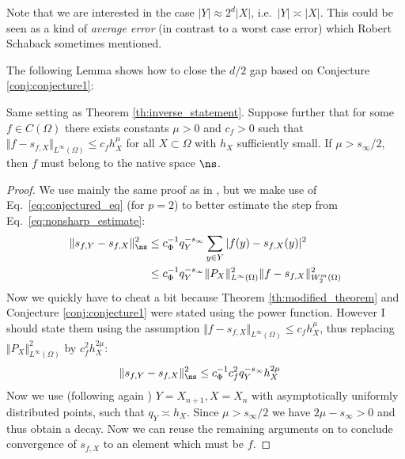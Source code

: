 \documentclass[a4paper, 10pt]{article}
\begin{document}
\begin{rem}
Note that we are interested in the case $|Y| \approx 2^d|X|$, i.e.\ $|Y| \asymp |X|$.
This could be seen as a kind of \textit{average error} (in contrast to a worst case error) which Robert Schaback sometimes mentioned.
\end{rem}

\noindent The following Lemma shows how to close the $d/2$ gap based on Conjecture \ref{conj:conjecture1}:

\begin{lemma}
\label{lem:d_half_gap_closed}
Same setting as Theorem \ref{th:inverse_statement}.
Suppose further that for some $f \in C(\Omega)$ there exists constants $\mu > 0$ and $c_f > 0$ such that $\Vert f - s_{f, X}\Vert_{L^\infty(\Omega)} \leq c_f h_X^\mu$ for all $X \subset \Omega$ with $h_X$ sufficiently small. 
If $\mu > s_\infty / 2$, then $f$ must belong to the native space $\ns$.
\end{lemma}

\begin{proof}
We use mainly the same proof as in \cite[Theorem 6.1]{wendland1997sobolev}, but we make use of Eq.\ \eqref{eq:conjectured_eq} (for $p=2$) to better estimate the step from Eq.\ \eqref{eq:nonsharp_estimate}:
\begin{align*}
%
\Vert s_{f, Y} - s_{f, X} \Vert_{\ns}^2 &\leq c_\Phi^{-1} q_Y^{-s_\infty} \sum_{y \in Y} |f(y) - s_{f, X}(y)|^2 \notag \\
&\leq c_\Phi^{-1} q_Y^{-s_\infty} \Vert P_{X} \Vert_{L^\infty(\Omega)}^2 \Vert f - s_{f, X} \Vert_{W_2^m(\Omega)}^2
\end{align*}
%
%
Now we quickly have to cheat a bit because Theorem \ref{th:modified_theorem} and Conjecture \ref{conj:conjecture1} were stated using the power function. 
However I should state them using the assumption $\Vert f - s_{f, X}\Vert_{L^\infty(\Omega)} \leq c_f h_X^\mu$, thus replacing $\Vert P_{X} \Vert_{L^\infty(\Omega)}^2$ by $c_f^2 h_X^{2\mu}$:
\begin{align*}
%
\Vert s_{f, Y} - s_{f, X} \Vert_{\ns}^2 &\leq c_\Phi^{-1} c_f^2 q_Y^{-s_\infty} h_X^{2\mu}
\end{align*}
Now we use (following again \cite[Theorem 6.1]{wendland1997sobolev}) $Y = X_{n+1}, X = X_n$ with asymptotically uniformly distributed points, such that $q_Y \asymp h_X$.
Since $\mu > s_\infty/2$ we have $2\mu - s_\infty > 0$ and thus obtain a decay. 
Now we can reuse the remaining arguments on \cite[Proof of Theorem 6.1]{wendland1997sobolev} to conclude convergence of $s_{f, X}$ to an element which must be $f$.
\end{proof}
\end{document}
